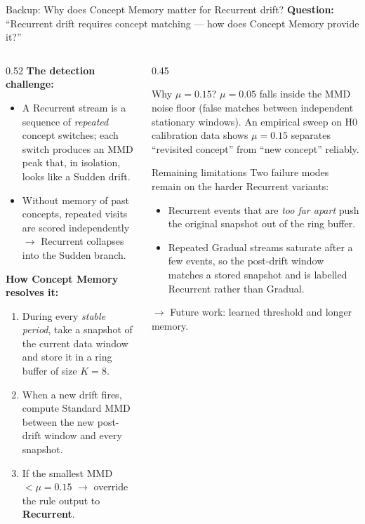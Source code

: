 \documentclass[aspectratio=169,10pt]{beamer}
\begin{document}
\begin{frame}{Backup: Why does Concept Memory matter for Recurrent drift?}
	\textbf{Question:} ``Recurrent drift requires concept matching --- how does Concept Memory provide it?''

	\vspace{0.5em}
	\begin{columns}[T]
		\begin{column}{0.52\textwidth}
			\textbf{The detection challenge:}
			\begin{itemize}
				\item A Recurrent stream is a sequence of \textit{repeated} concept switches; each switch produces an MMD peak that, in isolation, looks like a Sudden drift.
				\item Without memory of past concepts, repeated visits are scored independently $\to$ Recurrent collapses into the Sudden branch.
			\end{itemize}

			\vspace{0.5em}
			\textbf{How Concept Memory resolves it:}
			\begin{enumerate}
				\item During every \textit{stable period}, take a snapshot of the current data window and store it in a ring buffer of size $K = 8$.
				\item When a new drift fires, compute Standard MMD between the new post-drift window and every snapshot.
				\item If the smallest MMD $< \mu = 0.15$ $\to$ override the rule output to \textbf{Recurrent}.
			\end{enumerate}
		\end{column}
		\begin{column}{0.45\textwidth}
			\begin{exampleblock}{Why $\mu = 0.15$?}
				\small
				$\mu = 0.05$ falls inside the MMD noise floor (false matches between independent stationary windows). An empirical sweep on H0 calibration data shows $\mu = 0.15$ separates ``revisited concept'' from ``new concept'' reliably.
			\end{exampleblock}

			\vspace{0.3em}
			\begin{alertblock}{Remaining limitations}
				\small
				Two failure modes remain on the harder Recurrent variants:
				\begin{itemize}
					\item Recurrent events that are \textit{too far apart} push the original snapshot out of the ring buffer.
					\item Repeated Gradual streams saturate after a few events, so the post-drift window matches a stored snapshot and is labelled Recurrent rather than Gradual.
				\end{itemize}
				$\to$ Future work: learned threshold and longer memory.
			\end{alertblock}
		\end{column}
	\end{columns}
\end{frame}
\end{document}
